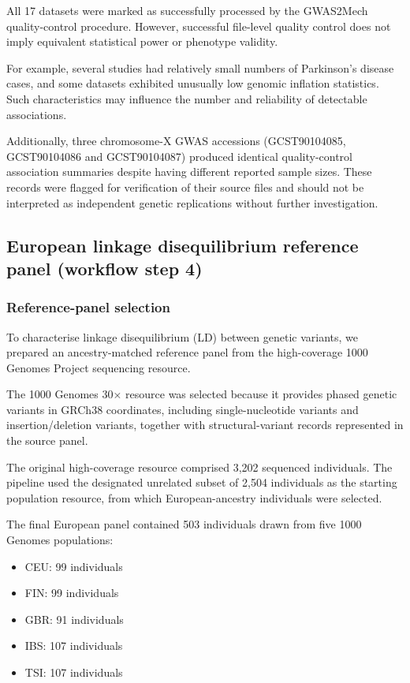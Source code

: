 \documentclass[11pt,a4paper]{article}
\begin{document}
All 17 datasets were marked as successfully processed
by the GWAS2Mech quality-control procedure. However,
successful file-level quality control does not imply
equivalent statistical power or phenotype validity.

For example, several studies had relatively small
numbers of Parkinson's disease cases, and some
datasets exhibited unusually low genomic inflation
statistics. Such characteristics may influence the
number and reliability of detectable associations.

Additionally, three chromosome-X GWAS accessions
(GCST90104085, GCST90104086 and GCST90104087)
produced identical quality-control association
summaries despite having different reported sample
sizes. These records were flagged for verification
of their source files and should not be interpreted
as independent genetic replications without
further investigation.


\subsection{European linkage disequilibrium reference panel (workflow step 4)}
\label{sec:reference_panel}

\subsubsection{Reference-panel selection}

To characterise linkage disequilibrium (LD) between
genetic variants, we prepared an ancestry-matched
reference panel from the high-coverage 1000 Genomes
Project sequencing resource.

The 1000 Genomes 30$\times$ resource was selected
because it provides phased genetic variants in
GRCh38 coordinates, including single-nucleotide
variants and insertion/deletion variants, together
with structural-variant records represented in the
source panel.

The original high-coverage resource comprised
3,202 sequenced individuals. The pipeline used the
designated unrelated subset of 2,504 individuals
as the starting population resource, from which
European-ancestry individuals were selected.

The final European panel contained 503 individuals
drawn from five 1000 Genomes populations:

\begin{itemize}
    \item CEU: 99 individuals
    \item FIN: 99 individuals
    \item GBR: 91 individuals
    \item IBS: 107 individuals
    \item TSI: 107 individuals
\end{itemize}
\end{document}
